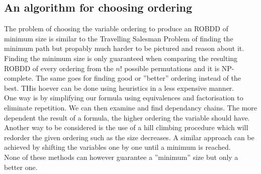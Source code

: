 \documentclass[a4paper]{article}
\begin{document}
\subsection*{An algorithm for choosing ordering}
The problem of choosing the variable ordering to produce an ROBDD of minimum size is similar to the Travelling Salesman Problem of finding the minimum path 
but propably much harder to be pictured and reason about it. Finding the minimum size is only guaranteed when comparing the resulting ROBDD of every ordering 
from the $n!$ possible permutations and it is NP-complete. The same goes for finding good or ''better''  ordering instead of the best. THis hoever can be done 
using heuristics in a less expensive manner.\\[0.25cm]
One way is by simplifying our formula using equivalences and factorisation to eliminate repetition. We can then examine and find dependancy chains. The more 
dependent the result of a formula, the higher ordering the variable should have. Another way to be considered is the use of a hill climbing procedure which will
redorder the given ordering such as the size decreases. A similar approach can be achieved by shifting the variables one by one until a minimum is reached. \\[0.25cm]
None of these methods can however guarantee a ''minimum'' size but only a better one.
\end{document}
